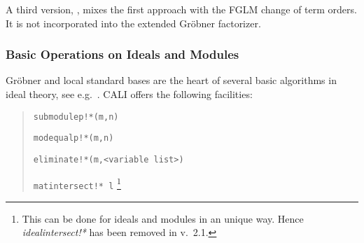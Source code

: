 A third version, , mixes the first approach with the
FGLM change of term orders. It is not incorporated into the extended
Gr\"obner factorizer.

\subsubsection{Basic Operations on Ideals and Modules}

Gr\"obner and local standard bases are the heart of several basic
algorithms in ideal theory, see e.g.\ \cite[6.2.]{BKW}. CALI offers
the following facilities:
\begin{quote}
\verb|submodulep!*(m,n)|


\verb|modequalp!*(m,n)|


\verb|eliminate!*(m,<variable list>)| 


\verb|matintersect!* l|
\footnote{This can be done for ideals and
modules in an unique way. Hence \emph{idealintersect!*} has been
removed in v.\ 2.1.}

\end{quote}

